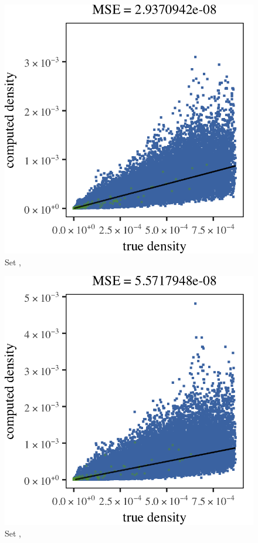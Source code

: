 \begin{subfigure}{0.23\textwidth}
	\centering
	\includegraphics[keepaspectratio=true, width=\textwidth, height=0.23\textheight]{result/img/results_baakman_4_60000_mbe_silverman}
	\caption{Set \baakmanFour, \mbe}
	\label{fig:results:singlesphere:mbe:baakman4}
\end{subfigure}	
\begin{subfigure}{0.23\textwidth}
	\centering
	\includegraphics[keepaspectratio=true, width=\textwidth, height=0.23\textheight]{result/img/results_baakman_5_60000_mbe_silverman}
	\caption{Set \baakmanFive, \mbe}
	\label{fig:results:singlesphere:mbe:baakman5}
\end{subfigure}
